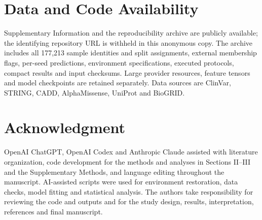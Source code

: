\documentclass[conference]{IEEEtran}
\begin{document}
\section*{Data and Code Availability}

Supplementary Information and the reproducibility archive are publicly available; the identifying repository URL is withheld in this anonymous copy. The archive includes all 177,213 sample identities and split assignments, external membership flags, per-seed predictions, environment specifications, executed protocols, compact results and input checksums. Large provider resources, feature tensors and model checkpoints are retained separately. Data sources are ClinVar, STRING, CADD, AlphaMissense, UniProt and BioGRID.

\section*{Acknowledgment}

OpenAI ChatGPT, OpenAI Codex and Anthropic Claude assisted with literature organization, code development for the methods and analyses in Sections II--III and the Supplementary Methods, and language editing throughout the manuscript. AI-assisted scripts were used for environment restoration, data checks, model fitting and statistical analysis. The authors take responsibility for reviewing the code and outputs and for the study design, results, interpretation, references and final manuscript.
\end{document}
